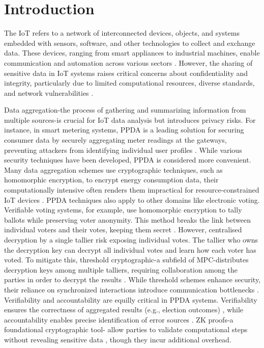 \chapter{Introduction}
The \ac{IoT} refers to a network of interconnected devices, objects, and systems embedded with sensors, software, and other technologies to collect and exchange data. These devices, ranging from smart appliances to industrial machines, enable communication and automation across various sectors \cite[1]{combinatorial}. However, the sharing of sensitive data in \ac{IoT} systems raises critical concerns about confidentiality and integrity, particularly due to limited computational resources, diverse standards, and network vulnerabilities \cite[1]{smpc}.

Data aggregation-the process of gathering and summarizing information from multiple sources-is crucial for \ac{IoT} data analysis but introduces privacy risks. For instance, in smart metering systems, \ac{PPDA} is a leading solution for securing consumer data by securely aggregating meter readings at the gateways, preventing attackers from identifying individual user profiles \cite[2]{ppda-fog}. While various security techniques have been developed, \ac{PPDA} is considered more convenient. Many data aggregation schemes use cryptographic techniques, such as homomorphic encryption, to encrypt energy consumption data, their computationally intensive often renders them impractical for resource-constrained \ac{IoT} devices \cite[113-114]{smart-meter}. \ac{PPDA} techniques also apply to other domains like electronic voting. Verifiable voting systems, for example, use homomorphic encryption to tally ballots while preserving voter anonymity. This method breaks the link between individual voters and their votes, keeping them secret \cite[53]{stuve-study}. However, centralised decryption by a single tallier risk exposing individual votes. The tallier who owns the decryption key can decrypt all individual votes and learn how each voter has voted. To mitigate this, threshold cryptographic-a subfield of \ac{MPC}-distributes decryption keys among multiple talliers, requiring collaboration among the parties in order to decrypt the results \cite[40]{stuve-study}. While threshold schemes enhance security, their reliance on synchronized interactions introduce communication bottlenecks \cite[45]{stuve-study}. Verifiability and accountability are equilly critical in \ac{PPDA} systems. Verifiability ensures the correctness of aggregated results (e.g., election outcomes) \cite[4]{stuve-study}, while accountability enables precise identification of error sources \cite[10, 27]{stuve-study}. \ac{ZK} proofs-a foundational cryptographic tool- allow parties to validate computational steps without revealing sensitive data \cite[13]{stuve-study}, though they incur additional overhead. 

